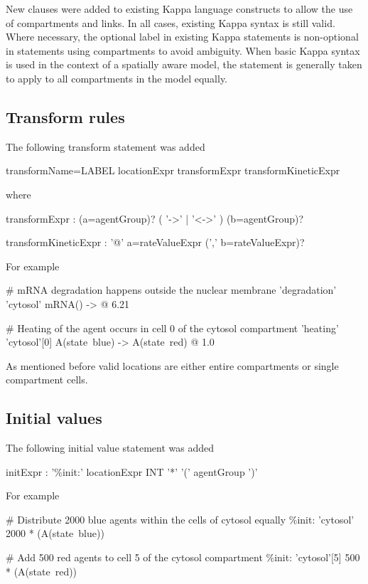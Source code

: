 New clauses were added to existing Kappa language constructs to allow the use of compartments and links. In all cases, existing Kappa syntax is still valid. Where necessary, the optional label in existing Kappa statements is non-optional in statements using compartments to avoid ambiguity. When basic Kappa syntax is used in the context of a spatially aware model, the statement is generally taken to apply to all compartments in the model equally.

\subsection{Transform rules}

The following transform statement was added

\begin{bnfsource}
transformName=LABEL locationExpr transformExpr transformKineticExpr 
\end{bnfsource}
  where
\begin{bnfsource}
transformExpr :
  (a=agentGroup)? ( '->' | '<->' ) (b=agentGroup)?

transformKineticExpr :
  '@' a=rateValueExpr (',' b=rateValueExpr)?
\end{bnfsource}
For example
\begin{kappasource}
# mRNA degradation happens outside the nuclear membrane
'degradation' 'cytosol' mRNA() -> @ 6.21

# Heating of the agent occurs in cell 0 of the cytosol compartment
'heating' 'cytosol'[0] A(state~blue) -> A(state~red) @ 1.0
\end{kappasource}

As mentioned before valid locations are either entire compartments or single compartment cells.

\subsection{Initial values}

The following initial value statement was added

\begin{bnfsource}
initExpr :
  '\%init:' locationExpr INT '*' '(' agentGroup ')'
\end{bnfsource}
For example
\begin{kappasource}
# Distribute 2000 blue agents within the cells of cytosol equally
\%init: 'cytosol' 2000 * (A(state~blue)) 

# Add 500 red agents to cell 5 of the cytosol compartment
\%init: 'cytosol'[5] 500 * (A(state~red)) 
\end{kappasource}


